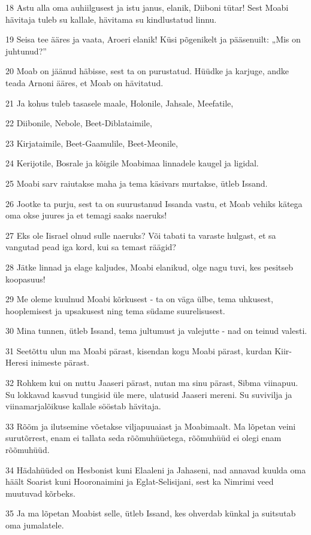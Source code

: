\par 18 Astu alla oma auhiilgusest ja istu janus, elanik, Diiboni tütar! Sest Moabi hävitaja tuleb su kallale, hävitama su kindlustatud linnu.
\par 19 Seisa tee ääres ja vaata, Aroeri elanik! Küsi põgenikelt ja pääsenuilt: „Mis on juhtunud?”
\par 20 Moab on jäänud häbisse, sest ta on purustatud. Hüüdke ja karjuge, andke teada Arnoni ääres, et Moab on hävitatud.
\par 21 Ja kohus tuleb tasasele maale, Holonile, Jahsale, Meefatile,
\par 22 Diibonile, Nebole, Beet-Diblataimile,
\par 23 Kirjataimile, Beet-Gaamulile, Beet-Meonile,
\par 24 Kerijotile, Bosrale ja kõigile Moabimaa linnadele kaugel ja ligidal.
\par 25 Moabi sarv raiutakse maha ja tema käsivars murtakse, ütleb Issand.
\par 26 Jootke ta purju, sest ta on suurustanud Issanda vastu, et Moab vehiks kätega oma okse juures ja et temagi saaks naeruks!
\par 27 Eks ole Iisrael olnud sulle naeruks? Või tabati ta varaste hulgast, et sa vangutad pead iga kord, kui sa temast räägid?
\par 28 Jätke linnad ja elage kaljudes, Moabi elanikud, olge nagu tuvi, kes pesitseb koopasuus!
\par 29 Me oleme kuulnud Moabi kõrkusest - ta on väga ülbe, tema uhkusest, hooplemisest ja upsakusest ning tema südame suurelisusest.
\par 30 Mina tunnen, ütleb Issand, tema jultumust ja valejutte - nad on teinud valesti.
\par 31 Seetõttu ulun ma Moabi pärast, kisendan kogu Moabi pärast, kurdan Kiir-Heresi inimeste pärast.
\par 32 Rohkem kui on nuttu Jaaseri pärast, nutan ma sinu pärast, Sibma viinapuu. Su lokkavad kasvud tungisid üle mere, ulatusid Jaaseri mereni. Su suvivilja ja viinamarjalõikuse kallale sööstab hävitaja.
\par 33 Rõõm ja ilutsemine võetakse viljapuuaiast ja Moabimaalt. Ma lõpetan veini surutõrrest, enam ei tallata seda rõõmuhüüetega, rõõmuhüüd ei olegi enam rõõmuhüüd.
\par 34 Hädahüüded on Hesbonist kuni Elaaleni ja Jahaseni, nad annavad kuulda oma häält Soarist kuni Hooronaimini ja Eglat-Selisijani, sest ka Nimrimi veed muutuvad kõrbeks.
\par 35 Ja ma lõpetan Moabist selle, ütleb Issand, kes ohverdab künkal ja suitsutab oma jumalatele.
